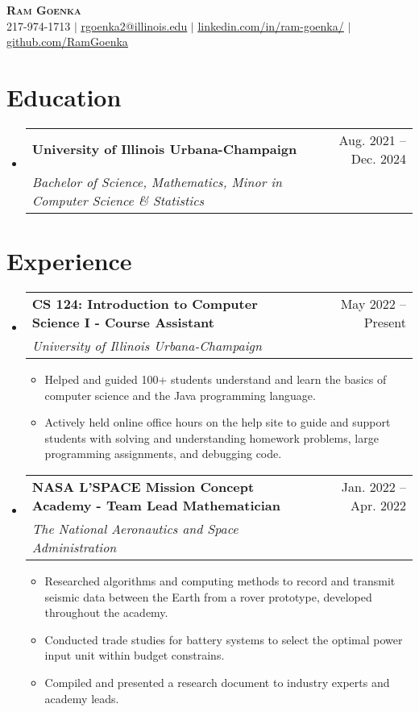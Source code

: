 \documentclass[letterpaper,11pt]{article}
\makeatletter
\newcommand{\resumeItem}[1]{
  \item\small{
    {#1 \vspace{-2pt}}
  }
}
\newcommand{\resumeSubheading}[4]{
  \vspace{-2pt}\item
    \begin{tabular*}{0.97\textwidth}[t]{l@{\extracolsep{\fill}}r}
      \textbf{#1} & #2 \\
      \textit{\small#3} & \textit{\small #4} \\
    \end{tabular*}\vspace{-7pt}
}
\newcommand{\resumeSubheading}[4]{
  \vspace{-2pt}\item
    \begin{tabular*}{0.97\textwidth}[t]{l@{\extracolsep{\fill}}r}
      \textbf{#1} & #2 \\
      \textit{\small#3} & \textit{\small #4} \\
    \end{tabular*}\vspace{-7pt}
}
\newcommand{\resumeSubHeadingListStart}{\begin{itemize}[leftmargin=0.15in, label={}]}
\newcommand{\resumeSubHeadingListEnd}{\end{itemize}}
\newcommand{\resumeItemListStart}{\begin{itemize}}
\newcommand{\resumeItemListEnd}{\end{itemize}\vspace{-5pt}}
\makeatother
\begin{document}
\begin{center}
    \textbf{\Huge \scshape Ram Goenka} \\ \vspace{1pt}
    \small 217-974-1713 $|$ \href{mailto:rgoenka2@illinois.edu}{\underline{rgoenka2@illinois.edu}} $|$ 
    \href{https://www.linkedin.com/in/ram-goenka/}{\underline{linkedin.com/in/ram-goenka/}} $|$
    \href{https://github.com/RamGoenka}{\underline{github.com/RamGoenka}}
\end{center}

\section{Education}
  \resumeSubHeadingListStart
    \resumeSubheading
      {University of Illinois Urbana-Champaign}{Aug. 2021 -- Dec. 2024}
      {Bachelor of Science, Mathematics, Minor in Computer Science \& Statistics}{~}
  \resumeSubHeadingListEnd


\section{Experience}
  \resumeSubHeadingListStart

    \resumeSubheading
      {CS 124: Introduction to Computer Science I - Course Assistant}{May 2022 -- Present}
      {University of Illinois Urbana-Champaign}{~~}
      \resumeItemListStart
        \resumeItem{Helped and guided 100+ students understand and learn the basics of computer science and the Java programming language.}
        \resumeItem{Actively held online office hours on the help site to guide and support students with solving and understanding homework problems, large programming assignments, and debugging code.}
      \resumeItemListEnd
      
    \resumeSubheading
      {NASA L'SPACE Mission Concept Academy - Team Lead Mathematician}{Jan. 2022 -- Apr. 2022}
      {The National Aeronautics and Space Administration}{~~~~~~}
      \resumeItemListStart
        \resumeItem{Researched algorithms and computing methods to record and transmit seismic data between the Earth from a rover prototype, developed throughout the academy.}
        \resumeItem{Conducted trade studies for battery systems to select the optimal power input unit within budget constrains.}
        \resumeItem{Compiled and presented a research document to industry experts and academy leads.}
    \resumeItemListEnd
  \resumeSubHeadingListEnd
\end{document}
